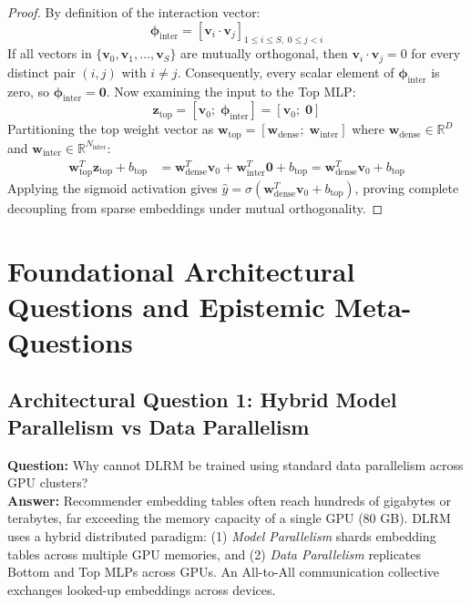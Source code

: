 \documentclass[11pt,a4paper]{article}
\theoremstyle{definition}
\begin{document}
\begin{proof}
By definition of the interaction vector:
{\boldmath
\begin{equation}
\boldsymbol{\phi}_{\text{inter}} = \left[ \mathbf{v}_i \cdot \mathbf{v}_j \right]_{1 \le i \le S, \; 0 \le j < i}
\end{equation}
}
If all vectors in $\{\mathbf{v}_0, \mathbf{v}_1, \dots, \mathbf{v}_S\}$ are mutually orthogonal, then $\mathbf{v}_i \cdot \mathbf{v}_j = 0$ for every distinct pair $(i, j)$ with $i \neq j$.
Consequently, every scalar element of $\boldsymbol{\phi}_{\text{inter}}$ is zero, so $\boldsymbol{\phi}_{\text{inter}} = \mathbf{0}$.
Now examining the input to the Top MLP:
{\boldmath
\begin{equation}
\mathbf{z}_{\text{top}} = [\mathbf{v}_0; \; \boldsymbol{\phi}_{\text{inter}}] = [\mathbf{v}_0; \; \mathbf{0}]
\end{equation}
}
Partitioning the top weight vector as $\mathbf{w}_{\text{top}} = [\mathbf{w}_{\text{dense}}; \; \mathbf{w}_{\text{inter}}]$ where $\mathbf{w}_{\text{dense}} \in \mathbb{R}^D$ and $\mathbf{w}_{\text{inter}} \in \mathbb{R}^{N_{\text{inter}}}$:
{\boldmath
\begin{align}
\mathbf{w}_{\text{top}}^T \mathbf{z}_{\text{top}} + b_{\text{top}} &= \mathbf{w}_{\text{dense}}^T \mathbf{v}_0 + \mathbf{w}_{\text{inter}}^T \mathbf{0} + b_{\text{top}} = \mathbf{w}_{\text{dense}}^T \mathbf{v}_0 + b_{\text{top}}
\end{align}
}
Applying the sigmoid activation gives $\widehat{y} = \sigma(\mathbf{w}_{\text{dense}}^T \mathbf{v}_0 + b_{\text{top}})$, proving complete decoupling from sparse embeddings under mutual orthogonality.
\end{proof}

\section{Foundational Architectural Questions and Epistemic Meta-Questions}

\subsection{Architectural Question 1: Hybrid Model Parallelism vs Data Parallelism}
\textbf{Question:} Why cannot DLRM be trained using standard data parallelism across GPU clusters?\\
\textbf{Answer:} Recommender embedding tables often reach hundreds of gigabytes or terabytes, far exceeding the memory capacity of a single GPU (80 GB). DLRM uses a hybrid distributed paradigm: (1) \emph{Model Parallelism} shards embedding tables across multiple GPU memories, and (2) \emph{Data Parallelism} replicates Bottom and Top MLPs across GPUs. An All-to-All communication collective exchanges looked-up embeddings across devices.
\end{document}
